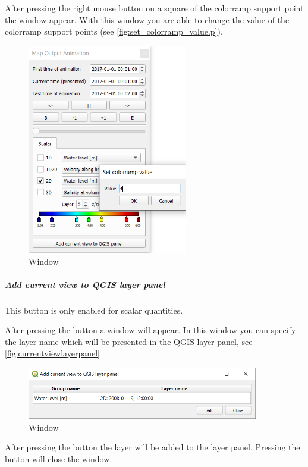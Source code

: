 \documentclass{deltares_memo}
\begin{document}
After pressing the right mouse button on a square of the colorramp support point the window  appear.
With this window you are able to change the value of the colorramp support points (see \autoref{fig:set_colorramp_value.p}).
\begin{figure}[H]
	\includegraphics[width=0.625\textwidth]{pictures/set_colorramp_value.png}
	\caption{Window \label{fig:currentviewlayerpanel}}
\end{figure}
\subparagraph*{Add current view to QGIS layer panel}
\Note This button is only enabled for scalar quantities.

After pressing the button  a window  will appear.
In this window you can specify the layer name which will be presented in the QGIS layer panel, see \autoref{fig:currentviewlayerpanel}
\begin{figure}[H]
	\centering
	\includegraphics[width=0.90\textwidth]{pictures/current_view_add.png}
	\caption{Window \label{fig:currentviewlayerpanel}}
\end{figure}
After pressing the button  the layer will be added to the layer panel.
Pressing the  button will close the window.
\end{document}
